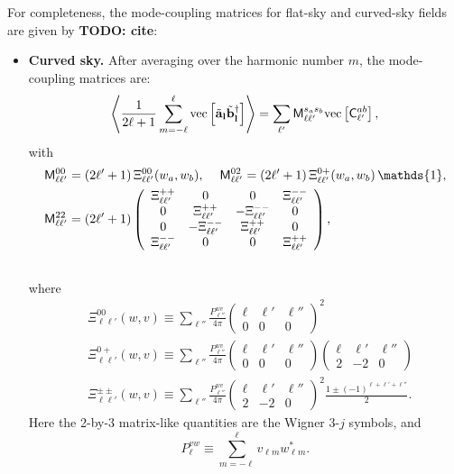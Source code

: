 \documentclass[a4paper,11pt]{article}
\newcommand{\todo}[1]{{\bf TODO: #1}}
\newcommand{\wtj}[6]{\left(\begin{array}{ccc} #1 & #2 & #3\\#4 & #5 & #6\end{array} \right)}
\begin{document}
    For completeness, the mode-coupling matrices for flat-sky and curved-sky fields are given by \todo{cite}:
    \begin{itemize}
      \item {\bf Curved sky.} After averaging over the harmonic number $m$, the mode-coupling matrices are:
      \begin{equation}
        \left\langle\frac{1}{2\ell+1}\sum_{m=-\ell}^\ell {\rm vec}\left[\tilde{\bf a}_{\bf l}\tilde{\bf b}^\dag_{\bf l}\right]\right\rangle=\sum_{\ell'}{\sf M}^{s_as_b}_{\ell\ell'} {\rm vec}\left[{\sf C}^{ab}_{\ell'}\right],
      \end{equation}
      with
      \begin{align}
        &{\sf M}^{00}_{\ell\ell'}=(2\ell'+1)\,\Xi^{00}_{\ell\ell'}(w_a,w_b),\hspace{12pt}
        {\sf M}^{02}_{\ell\ell'}=(2\ell'+1)\,\Xi^{0+}_{\ell\ell'}(w_a,w_b)\,\mathds{1},\\
        &{\sf M}^{22}_{\ell\ell'}=(2\ell'+1)
        \left(
        \begin{array}{cccc}
          \Xi^{++}_{\ell\ell'} & 0 & 0 & \Xi^{--}_{\ell\ell'} \\
          0 & \Xi^{++}_{\ell\ell'} & -\Xi^{--}_{\ell\ell'} & 0 \\
          0 & -\Xi^{--}_{\ell\ell'} & \Xi^{++}_{\ell\ell'} & 0 \\
          \Xi^{--}_{\ell\ell'} & 0 & 0 & \Xi^{++}_{\ell\ell'}
        \end{array}\right),\\\nonumber
      \end{align}
      where
      \begin{align}\label{eq:coeff_mcm}
        &\Xi^{00}_{\ell\ell'}(w,v)  \equiv\sum_{\ell''}\frac{P^{wv}_{\ell''}}{4\pi}\wtj{\ell}{\ell'}{\ell''}{0}{0}{0}^2\\
        &\Xi^{0+}_{\ell\ell'}(w,v)  \equiv\sum_{\ell''}\frac{P^{wv}_{\ell''}}{4\pi}\wtj{\ell}{\ell'}{\ell''}{0}{0}{0}\wtj{\ell}{\ell'}{\ell''}{2}{-2}{0}\\
        &\Xi^{\pm\pm}_{\ell\ell'}(w,v) \equiv\sum_{\ell''}\frac{P^{wv}_{\ell''}}{4\pi}\wtj{\ell}{\ell'}{\ell''}{2}{-2}{0}^2\frac{1\pm(-1)^{\ell+\ell'+\ell''}}{2}.
      \end{align}
      Here the 2-by-3 matrix-like quantities are the Wigner 3-$j$ symbols, and
      \begin{equation}
        P^{vw}_\ell\equiv\sum_{m=-\ell}^\ell v_{\ell m}w^*_{\ell m}.
      \end{equation}

\end{itemize}
\end{document}

